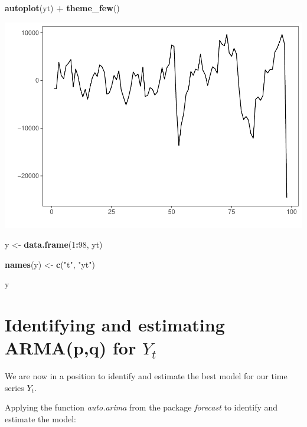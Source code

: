 \documentclass[11pt, a4paper]{report}
\newenvironment{Shaded}{\begin{snugshade}}{\end{snugshade}}
\newcommand{\DecValTok}[1]{\textcolor[rgb]{0.00,0.00,0.81}{#1}}
\newcommand{\KeywordTok}[1]{\textcolor[rgb]{0.13,0.29,0.53}{\textbf{#1}}}
\newcommand{\NormalTok}[1]{#1}
\newcommand{\OperatorTok}[1]{\textcolor[rgb]{0.81,0.36,0.00}{\textbf{#1}}}
\newcommand{\StringTok}[1]{\textcolor[rgb]{0.31,0.60,0.02}{#1}}
\theoremstyle{plain}
\theoremstyle{plain}
\theoremstyle{remark}
\begin{document}
\begin{Shaded}
	\begin{Highlighting}[]
		\KeywordTok{autoplot}\NormalTok{(yt) }\OperatorTok{+}\StringTok{ }\KeywordTok{theme_few}\NormalTok{()}
	\end{Highlighting}
\end{Shaded}

\begin{center}\includegraphics{Econo2_P5_files/figure-latex/stochastic yt-1} \end{center}

\begin{Shaded}
	\begin{Highlighting}[]
		\NormalTok{y <-}\StringTok{ }\KeywordTok{data.frame}\NormalTok{(}\DecValTok{1}\OperatorTok{:}\DecValTok{98}\NormalTok{, yt)}
		
		\KeywordTok{names}\NormalTok{(y) <-}\StringTok{ }\KeywordTok{c}\NormalTok{(}\StringTok{"t"}\NormalTok{, }\StringTok{"yt"}\NormalTok{)}
		
		\NormalTok{y}
	\end{Highlighting}
\end{Shaded}

\section{Identifying and estimating ARMA(p,q) for $Y_t$}

We are now in a position to identify and estimate the best model for our
time series \(Y_t\).

Applying the function \emph{auto.arima} from the package \emph{forecast}
to identify and estimate the model:
\end{document}
